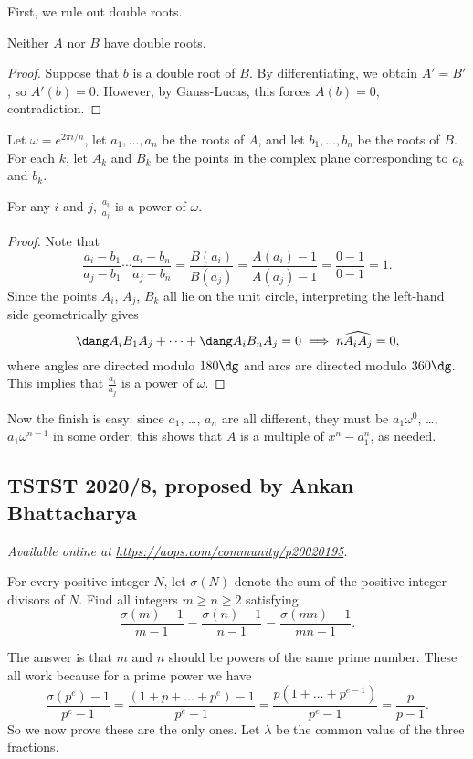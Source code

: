 \documentclass[11pt]{scrartcl}
\begin{document}
First, we rule out double roots.
\begin{claim*}
  Neither $A$ nor $B$ have double roots.
\end{claim*}
\begin{proof}
  Suppose that $b$ is a double root of $B$.
  By differentiating, we obtain $A' = B'$,
  so $A'(b) = 0$.
  However, by Gauss-Lucas,
  this forces $A(b) = 0$, contradiction.
\end{proof}
Let $\omega = e^{2\pi i/n}$,
let $a_1, \dots, a_n$ be the roots of $A$,
and let $b_1, \dots, b_n$ be the roots of $B$.
For each $k$,
let $A_k$ and $B_k$ be the points in the complex plane
corresponding to $a_k$ and $b_k$.
\begin{claim*}
  For any $i$ and $j$,
  $\tfrac{a_i}{a_j}$ is a power of $\omega$.
\end{claim*}
\begin{proof}
  Note that
  \[ \frac{a_i - b_1}{a_j - b_1} \dotsm \frac{a_i - b_n}{a_j - b_n}
    = \frac{B(a_i)}{B(a_j)} = \frac{A(a_i) - 1}{A(a_j) - 1} = \frac{0-1}{0-1} = 1. \]
  Since the points $A_i$, $A_j$, $B_k$ all lie on the unit circle,
  interpreting the left-hand side geometrically gives
  \[ \dang A_iB_1A_j + \dots + \dang A_iB_nA_j = 0
    \implies n \widehat{A_iA_j} = 0, \]
  where angles are directed modulo $180\dg$
  and arcs are directed modulo $360\dg$.
  This implies that $\tfrac{a_i}{a_j}$ is a power of $\omega$.
\end{proof}
Now the finish is easy:
since $a_1$, \dots, $a_n$ are all different,
they must be $a_1 \omega^0$, \dots, $a_1 \omega^{n-1}$ in some order;
this shows that $A$ is a multiple of $x^n-a_1^n$, as needed.
\pagebreak

\subsection{TSTST 2020/8, proposed by Ankan Bhattacharya}
\textsl{Available online at \url{https://aops.com/community/p20020195}.}
\begin{mdframed}[style=mdpurplebox,frametitle={Problem statement}]
For every positive integer $N$,
let $\sigma(N)$ denote the sum of the positive integer divisors of $N$.
Find all integers $m \ge n \ge 2$ satisfying
\[ \frac{\sigma(m)-1}{m-1}
  = \frac{\sigma(n)-1}{n-1} = \frac{\sigma(mn)-1}{mn-1}.  \]
\end{mdframed}
The answer is that $m$ and $n$ should be powers
of the same prime number.
These all work because for a prime power we have
\[
  \frac{\sigma(p^e) - 1}{p^e - 1}
  = \frac{(1 + p + \dots + p^e) - 1}{p^e - 1}
  = \frac{p(1 + \dots + p^{e-1})}{p^e - 1}
  = \frac{p}{p-1}.
\]
So we now prove these are the only ones.
Let $\lambda$ be the common value of the three fractions.
\end{document}
